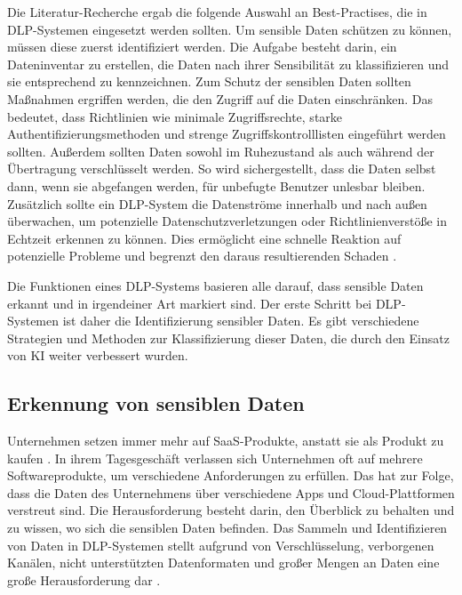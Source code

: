 Die Literatur-Recherche ergab die folgende Auswahl an Best-Practises, die in DLP-Systemen eingesetzt werden sollten. Um sensible Daten schützen zu können, müssen diese zuerst identifiziert werden. Die Aufgabe besteht darin, ein Dateninventar zu erstellen, die Daten nach ihrer Sensibilität zu klassifizieren und sie entsprechend zu kennzeichnen. Zum Schutz der sensiblen Daten sollten Maßnahmen ergriffen werden, die den Zugriff auf die Daten einschränken. Das bedeutet, dass Richtlinien wie minimale Zugriffsrechte, starke Authentifizierungsmethoden und strenge Zugriffskontrolllisten eingeführt werden sollten. Außerdem sollten Daten sowohl im Ruhezustand als auch während der Übertragung verschlüsselt werden. So wird sichergestellt, dass die Daten selbst dann, wenn sie abgefangen werden, für unbefugte Benutzer unlesbar bleiben. Zusätzlich sollte ein DLP-System die Datenströme innerhalb und nach außen überwachen, um potenzielle Datenschutzverletzungen oder Richtlinienverstöße in Echtzeit erkennen zu können. Dies ermöglicht eine schnelle Reaktion auf potenzielle Probleme und begrenzt den daraus resultierenden Schaden \cite{Hussain.2022}\cite{HerreraMontano.2022}\cite{Shishodia.2022}. %

Die Funktionen eines DLP-Systems basieren alle darauf, dass sensible Daten erkannt und in irgendeiner Art markiert sind. Der erste Schritt bei DLP-Systemen ist daher die Identifizierung sensibler Daten. Es gibt verschiedene Strategien und Methoden zur Klassifizierung dieser Daten, die durch den Einsatz von KI weiter verbessert wurden.

\subsection{Erkennung von sensiblen Daten}
Unternehmen setzen immer mehr auf SaaS-Produkte, anstatt sie als Produkt zu kaufen \cite{Gartner.2023}. In ihrem Tagesgeschäft verlassen sich Unternehmen oft auf mehrere Softwareprodukte, um verschiedene Anforderungen zu erfüllen. Das hat zur Folge, dass die Daten des Unternehmens über verschiedene Apps und Cloud-Plattformen verstreut sind. Die Herausforderung besteht darin, den Überblick zu behalten und zu wissen, wo sich die sensiblen Daten befinden. Das Sammeln und Identifizieren von Daten in DLP-Systemen stellt aufgrund von Verschlüsselung, verborgenen Kanälen, nicht unterstützten Datenformaten und großer Mengen an Daten eine große Herausforderung dar \cite{Hauer.2015}.

